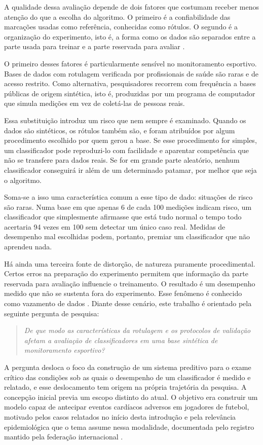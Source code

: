 A qualidade dessa avaliação depende de dois fatores que costumam receber menos atenção do que a escolha do algoritmo. O primeiro é a confiabilidade das marcações usadas como referência, conhecidas como rótulos. O segundo é a organização do experimento, isto é, a forma como os dados são separados entre a parte usada para treinar e a parte reservada para avaliar \cite{vaneetvelde2021}.

O primeiro desses fatores é particularmente sensível no monitoramento esportivo. Bases de dados com rotulagem verificada por profissionais de saúde são raras e de acesso restrito. Como alternativa, pesquisadores recorrem com frequência a bases públicas de origem sintética, isto é, produzidas por um programa de computador que simula medições em vez de coletá-las de pessoas reais.

Essa substituição introduz um risco que nem sempre é examinado. Quando os dados são sintéticos, os rótulos também são, e foram atribuídos por algum procedimento escolhido por quem gerou a base. Se esse procedimento for simples, um classificador pode reproduzi-lo com facilidade e aparentar competência que não se transfere para dados reais. Se for em grande parte aleatório, nenhum classificador conseguirá ir além de um determinado patamar, por melhor que seja o algoritmo.

Soma-se a isso uma característica comum a esse tipo de dado: situações de risco são raras. Numa base em que apenas 6 de cada 100 medições indicam risco, um classificador que simplesmente afirmasse que está tudo normal o tempo todo acertaria 94 vezes em 100 sem detectar um único caso real. Medidas de desempenho mal escolhidas podem, portanto, premiar um classificador que não aprendeu nada.

Há ainda uma terceira fonte de distorção, de natureza puramente procedimental. Certos erros na preparação do experimento permitem que informação da parte reservada para avaliação influencie o treinamento. O resultado é um desempenho medido que não se sustenta fora do experimento. Esse fenômeno é conhecido como vazamento de dados \cite{vaneetvelde2021}. Diante desse cenário, este trabalho é orientado pela seguinte pergunta de pesquisa:

\begin{quote}
\textit{De que modo as características da rotulagem e os protocolos de validação afetam a avaliação de classificadores em uma base sintética de monitoramento esportivo?}
\end{quote}

A pergunta desloca o foco da construção de um sistema preditivo para o exame crítico das condições sob as quais o desempenho de um classificador é medido e relatado, e esse deslocamento tem origem na própria trajetória da pesquisa. A concepção inicial previa um escopo distinto do atual. O objetivo era construir um modelo capaz de antecipar eventos cardíacos adversos em jogadores de futebol, motivado pelos casos relatados no início desta introdução e pela relevância epidemiológica que o tema assume nessa modalidade, documentada pelo registro mantido pela federação internacional \cite{meyer2022}.

